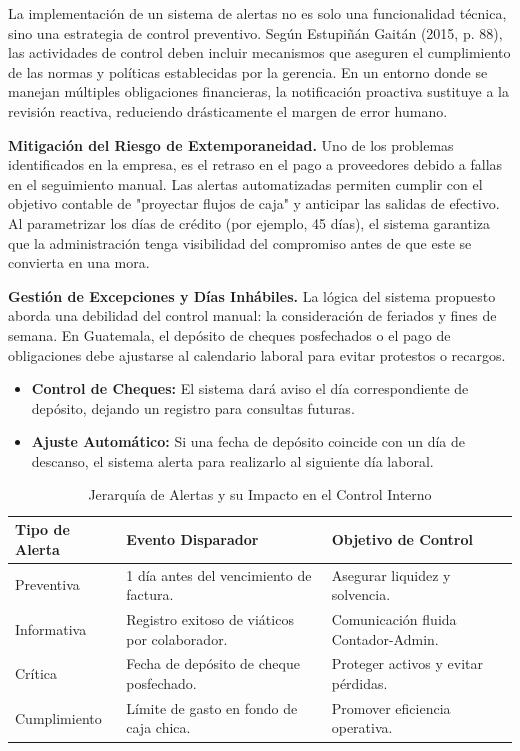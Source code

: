 La implementación de un sistema de alertas no es solo una funcionalidad técnica, sino una estrategia de control preventivo. Según Estupiñán Gaitán (2015, p. 88), las actividades de control deben incluir mecanismos que aseguren el cumplimiento de las normas y políticas establecidas por la gerencia. En un entorno donde se manejan múltiples obligaciones financieras, la notificación proactiva sustituye a la revisión reactiva, reduciendo drásticamente el margen de error humano.

\textbf{Mitigación del Riesgo de Extemporaneidad.} Uno de los problemas identificados en la empresa, es el retraso en el pago a proveedores debido a fallas en el seguimiento manual. Las alertas automatizadas permiten cumplir con el objetivo contable de "proyectar flujos de caja" y anticipar las salidas de efectivo. Al parametrizar los días de crédito (por ejemplo, 45 días), el sistema garantiza que la administración tenga visibilidad del compromiso antes de que este se convierta en una mora.

\textbf{Gestión de Excepciones y Días Inhábiles.} La lógica del sistema propuesto aborda una debilidad del control manual: la consideración de feriados y fines de semana. En Guatemala, el depósito de cheques posfechados o el pago de obligaciones debe ajustarse al calendario laboral para evitar protestos o recargos.

\begin{itemize}
    \item \textbf{Control de Cheques:} El sistema dará aviso el día correspondiente de depósito, dejando un registro para consultas futuras.
    \item \textbf{Ajuste Automático:} Si una fecha de depósito coincide con un día de descanso, el sistema alerta para realizarlo al siguiente día laboral.
\end{itemize}

\begin{table}[h]
    \centering
    \caption{Jerarquía de Alertas y su Impacto en el Control Interno}
    \vspace{0.2cm}
    \begin{tabular}{p{3cm} p{5cm} p{5cm}}
        \toprule
        \textbf{Tipo de Alerta} & \textbf{Evento Disparador} & \textbf{Objetivo de Control} \\
        \midrule
        Preventiva & 1 día antes del vencimiento de factura. & Asegurar liquidez y solvencia. \\
        Informativa & Registro exitoso de viáticos por colaborador. & Comunicación fluida Contador-Admin. \\
        Crítica & Fecha de depósito de cheque posfechado. & Proteger activos y evitar pérdidas. \\
        Cumplimiento & Límite de gasto en fondo de caja chica. & Promover eficiencia operativa. \\
        \bottomrule
    \end{tabular}
\end{table}

